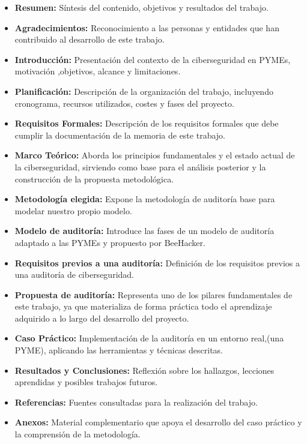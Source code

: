 \documentclass[a4paper, 11pt]{article}
\begin{document}
\begin{itemize}

    \item \textbf{Resumen:} Síntesis del contenido, objetivos y resultados del trabajo.

    \item \textbf{Agradecimientos:} Reconocimiento a las personas y entidades que han contribuido al desarrollo de este trabajo.
        
    \item \textbf{Introducción:} Presentación del contexto de la ciberseguridad en PYMEs, motivación ,objetivos, alcance y limitaciones.
    
    \item \textbf{Planificación:} Descripción de la organización del trabajo, incluyendo cronograma, recursos utilizados, costes y fases del proyecto.
    
    \item \textbf{Requisitos Formales:} Descripción de los requisitos formales que debe cumplir la documentación de la memoria de este trabajo.
    
    \item \textbf{Marco Teórico:} Aborda los principios fundamentales y el estado actual de la ciberseguridad, sirviendo como base para el análisis posterior y la construcción de la propuesta metodológica.
    
    \item \textbf{Metodología elegida:} Expone la metodología de auditoría base para modelar nuestro propio modelo.
    
    \item \textbf{Modelo de auditoría:} Introduce las fases de un modelo de auditoría adaptado a las PYMEs y propuesto por BeeHacker.
    
    \item \textbf{Requisitos previos a una auditoría:} Definición de los requisitos previos a una auditoría de ciberseguridad.
    
    \item \textbf{Propuesta de auditoría:} Representa uno de los pilares fundamentales de este trabajo, ya que materializa de forma práctica todo el aprendizaje adquirido a lo largo del desarrollo del proyecto.

    \item \textbf{Caso Práctico:} Implementación de la auditoría en un entorno real,(una PYME), aplicando las herramientas y técnicas descritas.
        
    \item \textbf{Resultados y Conclusiones:} Reflexión sobre los hallazgos, lecciones aprendidas y posibles trabajos futuros.
    
    \item \textbf{Referencias:} Fuentes consultadas para la realización del trabajo.
    
    \item \textbf{Anexos:}  Material complementario que apoya el desarrollo del caso práctico y la comprensión de la metodología.

\end{itemize}
\end{document}
